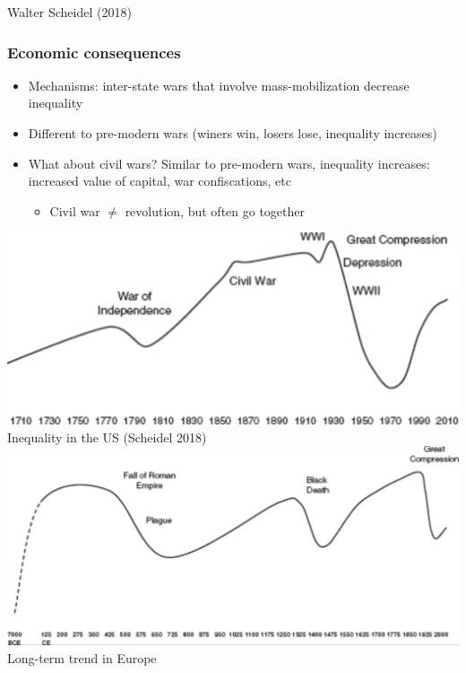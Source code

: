 \documentclass[aspectratio=43]{beamer}
\begin{document}
\begin{frame}
\begin{minipage}{0.39\textwidth}
{\small Walter Scheidel (2018)}
\end{minipage}

\end{frame}

\begin{frame}
\frametitle{Economic consequences}
\centering

\begin{minipage}{0.49\textwidth}\centering
\begin{itemize}
  \item Mechanisms: inter-state wars that involve mass-mobilization decrease inequality
  \item Different to pre-modern wars (winers win, losers lose, inequality increases)
  \item What about civil wars? Similar to pre-modern wars, inequality increases: increased value of capital, war confiscations, etc
  \begin{itemize}
    \item Civil war $\neq$ revolution, but often go together
  \end{itemize}
\end{itemize}
\end{minipage}\hfill
\begin{minipage}{0.49\textwidth}\centering
\includegraphics[width = \textwidth]{img/ineq-us}\\\vspace{5pt}
{\footnotesize Inequality in the US (Scheidel 2018)}\\\vspace{15pt}
\includegraphics[width = \textwidth]{img/ineq-long-term-europe}\\\vspace{5pt}
{\footnotesize Long-term trend in Europe}
\end{minipage}

\end{frame}
\end{document}
